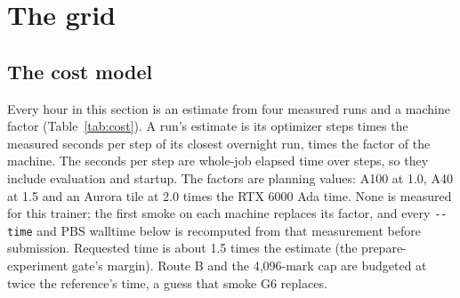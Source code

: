 
\section{The grid}
\label{sec:grid}

\subsection{The cost model}
\label{sec:cost}

Every hour in this section is an estimate from four measured runs and a machine factor
(Table~\ref{tab:cost}). A run's estimate is its optimizer steps times the measured seconds per
step of its closest overnight run, times the factor of the machine. The seconds per step are
whole-job elapsed time over steps, so they include evaluation and startup. The factors are
planning values: A100 at 1.0, A40 at 1.5 and an Aurora tile at 2.0 times the RTX 6000 Ada time.
None is measured for this trainer; the first smoke on each machine replaces its factor, and
every \texttt{-{}-time} and PBS walltime below is recomputed from that measurement before
submission. Requested time is about 1.5 times the estimate (the prepare-experiment gate's
margin). Route B and the 4{,}096-mark cap are budgeted at twice the reference's time, a guess
that smoke G6 replaces.

